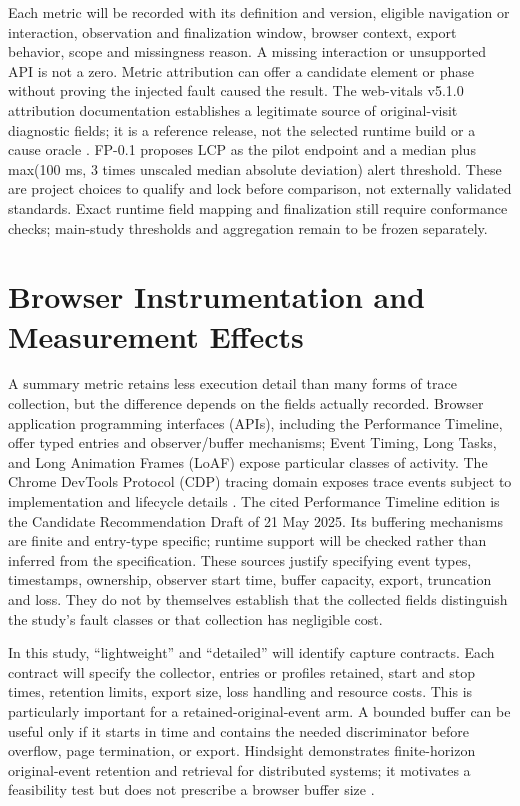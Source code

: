 Each metric will be recorded with its definition and version, eligible navigation or interaction, observation and finalization window, browser context, export behavior, scope and missingness reason. A missing interaction or unsupported API is not a zero. Metric attribution can offer a candidate element or phase without proving the injected fault caused the result. The web-vitals v5.1.0 attribution documentation establishes a legitimate source of original-visit diagnostic fields; it is a reference release, not the selected runtime build or a cause oracle \parencite{N33VTKAN}. FP-0.1 proposes LCP as the pilot endpoint and a median plus max(100 ms, 3 times unscaled median absolute deviation) alert threshold. These are project choices to qualify and lock before comparison, not externally validated standards. Exact runtime field mapping and finalization still require conformance checks; main-study thresholds and aggregation remain to be frozen separately.

\section{Browser Instrumentation and Measurement Effects}

A summary metric retains less execution detail than many forms of trace collection, but the difference depends on the fields actually recorded. Browser application programming interfaces (APIs), including the Performance Timeline, offer typed entries and observer/buffer mechanisms; Event Timing, Long Tasks, and Long Animation Frames (LoAF) expose particular classes of activity. The Chrome DevTools Protocol (CDP) tracing domain exposes trace events subject to implementation and lifecycle details \parencite{REP5RHB6,I8L7FN9V,KEJFZJHV,6SJEG5G9,63QKVL86}. The cited Performance Timeline edition is the Candidate Recommendation Draft of 21 May 2025. Its buffering mechanisms are finite and entry-type specific; runtime support will be checked rather than inferred from the specification. These sources justify specifying event types, timestamps, ownership, observer start time, buffer capacity, export, truncation and loss. They do not by themselves establish that the collected fields distinguish the study's fault classes or that collection has negligible cost.

In this study, “lightweight” and “detailed” will identify capture contracts. Each contract will specify the collector, entries or profiles retained, start and stop times, retention limits, export size, loss handling and resource costs. This is particularly important for a retained-original-event arm. A bounded buffer can be useful only if it starts in time and contains the needed discriminator before overflow, page termination, or export. Hindsight demonstrates finite-horizon original-event retention and retrieval for distributed systems; it motivates a feasibility test but does not prescribe a browser buffer size \parencite{3ED3FDXH}.

